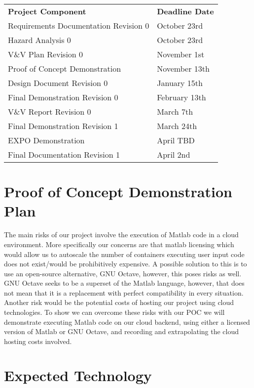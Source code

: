 \documentclass{article}
\begin{document}
\begin{table}[H]
\begin{tabular}{ll}
\textbf{Project Component}           & \textbf{Deadline Date} \\
Requirements Documentation Revision 0 & October 23rd  \\
Hazard Analysis 0                     & October 23rd  \\
V\&V Plan Revision 0                   & November 1st  \\
Proof of Concept Demonstration        & November 13th \\
Design Document Revision 0            & January 15th  \\
Final Demonstration Revision 0        & February 13th \\
V\&V Report Revision 0                 & March 7th     \\
Final Demonstration Revision 1        & March 24th    \\
EXPO Demonstration                    & April TBD     \\
Final Documentation Revision 1        & April 2nd     \\
\end{tabular}
\end{table}

\section{Proof of Concept Demonstration Plan}

The main risks of our project involve the execution of Matlab code in a cloud environment. More specifically our concerns are that matlab licensing which would allow us to autoscale the number of containers executing user input code does not exist/would be prohibitively expensive. A possible solution to this is to use an open-source alternative, GNU Octave, however, this poses risks as well. GNU Octave seeks to be a superset of the Matlab language, however, that does not mean that it is a replacement with perfect compatibility in every situation. Another risk would be the potential costs of hosting our project using cloud technologies. To show we can overcome these risks with our POC we will demonstrate executing Matlab code on our cloud backend, using either a licensed version of Matlab or GNU Octave, and recording and extrapolating the cloud hosting costs involved.

\section{Expected Technology}
\end{document}
